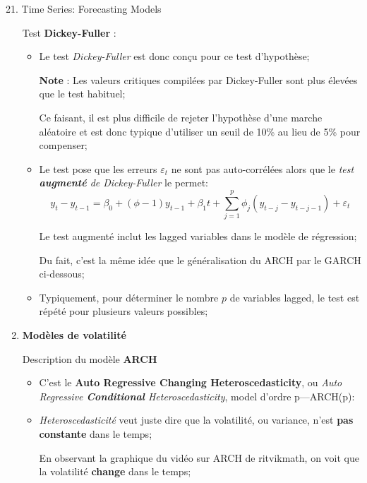 \documentclass[12pt, titlepage, french]{report}
\begin{document}
\begin{CHPT_SUMM}[label = {timeseries21}]{21. Time Series: Forecasting Models}
\begin{enumerate}
\begin{itemize}
\begin{align*}
			\end{align*}
		\setlength{\mathindent}{1cm}
		\item	Cependant, puisque sous l'hypothèse nulle la série est une marche aléatoire, $t_{ddl}$ \textit{ne suit \textbf{pas} la distribution $t$ habituelle} ($t_{ddl} \not\sim t$) mais plutôt une distribution spéciale;
		\end{itemize}
%		
	\item[]	Test \textbf{Dickey-Fuller} :
		\begin{itemize}
		\item	Le test \textit{Dickey-Fuller} est donc conçu pour ce test d'hypothèse;
		\item[\textbf{Note}]: Les valeurs critiques compilées par Dickey-Fuller sont plus élevées que le test habituel;
		\item[]	Ce faisant, il est plus difficile de rejeter l'hypothèse d'une marche aléatoire et est donc typique d'utiliser un seuil de 10\% au lieu de 5\% pour compenser;		
		\item	Le test pose que les erreurs $\varepsilon_{t}$ ne sont pas auto-corrélées alors que le \textit{test \textbf{augmenté} de Dickey-Fuller} le permet:
			\begin{equation*}
			y_{t} - y_{t - 1}	
			=	\beta_{0} + (\phi - 1) y_{t - 1} + \beta_{1} t + \sum_{j = 1}^{p} \phi_{j} (y_{t - j} - y_{t - j - 1}) + \varepsilon_{t}
			\end{equation*}
		\item[]	Le test augmenté inclut les lagged variables dans le modèle de régression;
		\item[]	Du fait, c'est la même idée que le généralisation du ARCH par le GARCH ci-dessous;
		\item	Typiquement, pour déterminer le nombre $p$ de variables lagged, le test est répété pour plusieurs valeurs possibles;
		\end{itemize}
	\item	\textbf{Modèles de volatilité}
	\item[]	Description du modèle \textbf{ARCH}
		\begin{itemize}
		\item	C'est le \textbf{Auto Regressive Changing Heteroscedasticity}, ou \textit{Auto Regressive \textbf{Conditional} Heteroscedasticity}, model d'ordre p---ARCH(p):
		\item	\textit{Heteroscedasticité} veut juste dire que la volatilité, ou variance, n'est \textbf{pas constante} dans le temps;
		\item[]	En observant la graphique du vidéo sur ARCH de ritvikmath, on voit que la volatilité \textbf{change} dans le temps;

\end{itemize}
\end{enumerate}
\end{CHPT_SUMM}
\end{document}

